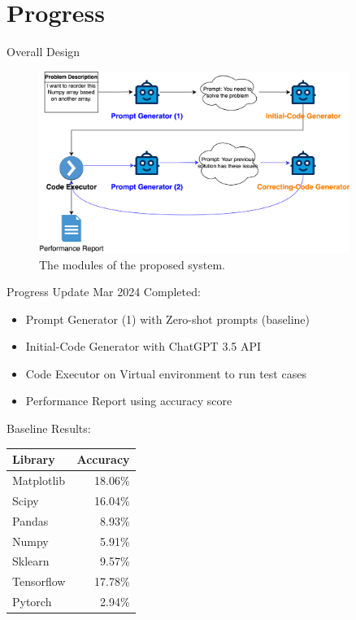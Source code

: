 \section{Progress}

\begin{frame}{Overall Design}
    \begin{figure}[!htb]
        \centering
        \includegraphics[width=0.9\textwidth]{img/selfdebug_design}
        \captionsetup{font=small,labelformat=empty}
        \caption{The modules of the proposed system.}
    \end{figure}
\end{frame}

\begin{frame}{Progress Update  Mar 2024}
    Completed:
    \begin{itemize}
        \item Prompt Generator (1) with Zero-shot prompts (baseline)
        \item Initial-Code Generator with ChatGPT 3.5 API
        \item Code Executor on Virtual environment to run test cases
        \item Performance Report using accuracy score
    \end{itemize}

    Baseline Results:
    \begin{tabular}{lr}
        Library    & Accuracy \\
        \hline
        Matplotlib & 18.06\%  \\
        Scipy      & 16.04\%  \\
        Pandas     & 8.93\%   \\
        Numpy      & 5.91\%   \\
        Sklearn    & 9.57\%   \\
        Tensorflow & 17.78\%  \\
        Pytorch    & 2.94\%   \\
    \end{tabular}
\end{frame}

